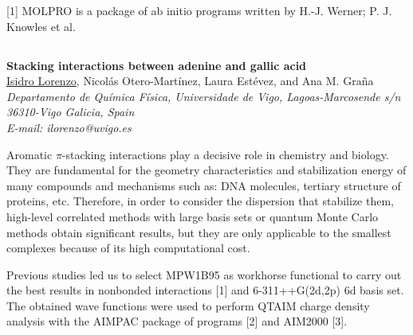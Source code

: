 {\footnotesize
[1] MOLPRO is a package of ab initio programs written by H.-J. Werner; P. J. Knowles et al.}


\newpage
\setcounter{figure}{0}
\begin{center}
\section*{}
{\bf \Large
Stacking interactions between adenine and gallic acid
}
\\
\vspace{0.5cm}
\underline{Isidro Lorenzo}, Nicolás Otero-Martínez, Laura Estévez, and Ana M. Graña
\\
\vspace{0.5cm}
{\it
Departamento de Química Física, Universidade de Vigo, Lagoas-Marcosende s/n 36310-Vigo
Galicia, Spain
}
\\
\vspace{0.5cm}
{\it E-mail: ilorenzo@uvigo.es}
\\
\vspace{0.5cm}
\end{center}
Aromatic $\pi$-stacking interactions play a decisive role in chemistry and
biology. They are fundamental for the geometry characteristics and stabilization
energy of many compounds and mechanisms such as: DNA molecules, tertiary
structure of proteins, etc. Therefore, in order to consider the dispersion that stabilize
them, high-level correlated methods with large basis sets or quantum Monte Carlo
methods obtain significant results, but they are only applicable to the smallest
complexes because of its high computational cost.

Previous studies led us to select MPW1B95 as workhorse functional to carry
out the best results in nonbonded interactions [1] and 6-311++G(2d,2p) 6d basis set.
The obtained wave functions were used to perform QTAIM charge density analysis
with the AIMPAC package of programs [2] and AIM2000 [3].

